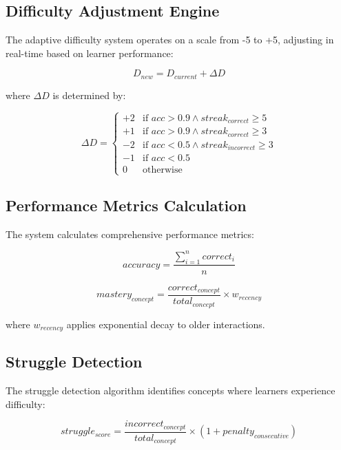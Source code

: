 \documentclass[conference]{IEEEtran}
\begin{document}
\subsection{Difficulty Adjustment Engine}

The adaptive difficulty system operates on a scale from -5 to +5, adjusting in real-time based on learner performance:

\begin{equation}
D_{new} = D_{current} + \Delta D
\end{equation}

where $\Delta D$ is determined by:

\begin{equation}
\Delta D = \begin{cases}
+2 & \text{if } acc > 0.9 \land streak_{correct} \geq 5 \\
+1 & \text{if } acc > 0.9 \land streak_{correct} \geq 3 \\
-2 & \text{if } acc < 0.5 \land streak_{incorrect} \geq 3 \\
-1 & \text{if } acc < 0.5 \\
0 & \text{otherwise}
\end{cases}
\end{equation}

\subsection{Performance Metrics Calculation}

The system calculates comprehensive performance metrics:

\begin{equation}
accuracy = \frac{\sum_{i=1}^{n} correct_i}{n}
\end{equation}

\begin{equation}
mastery_{concept} = \frac{correct_{concept}}{total_{concept}} \times w_{recency}
\end{equation}

where $w_{recency}$ applies exponential decay to older interactions.

\subsection{Struggle Detection}

The struggle detection algorithm identifies concepts where learners experience difficulty:

\begin{equation}
struggle_{score} = \frac{incorrect_{concept}}{total_{concept}} \times (1 + penalty_{consecutive})
\end{equation}
\end{document}

